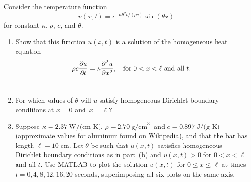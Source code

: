 
Consider the temperature function
\[
u(x,t) = e^{-\kappa \theta^2 t/(\rho c)} \sin(\theta x)
\]
for constant $\kappa$, $\rho$, $c$, and $\theta$.
\\
\begin{enumerate}
\item Show that this function $u(x,t)$ is a solution of the homogeneous heat equation
 \[
\rho c {{\partial} u \over {\partial} t} = \kappa {{\partial}^2 u\over {\partial}x^2},\quad\mbox{for }0<x<\ell\mbox{ and all }t.
\]
\\
\item For which values of $\theta$ will $u$ satisfy homogeneous Dirichlet boundary conditions at $x=0$ and~$x=\ell$?
\\
\item Suppose $\kappa = 2.37\;\mbox{W/(cm K)}$, $\rho = 2.70\;\mbox{g/cm}^3$, and $c = 0.897\; \mbox{J/(g K)}$ (approximate values for aluminum found on Wikipedia), and that the bar has length $\ell = 10\;\mbox{cm}$. Let $\theta$ be such that $u(x,t)$ satisfies homogeneous Dirichlet boundary conditions as in part~(b) and $u(x,t)>0$ for $0<x<\ell$ and all $t$. Use MATLAB to plot the solution $u(x,t)$  for $0\le x\le \ell$ at times $t = 0, 4, 8, 12, 16, 20$ seconds, superimposing all six plots on the same axis.
\end{enumerate}




